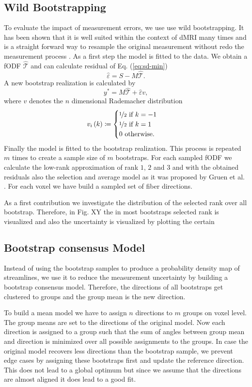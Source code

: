 \subsection{Wild Bootstrapping}
To evaluate the impact of measurement errors, we use use wild bootstrapping. It
has been shown that it is well suited within the context of dMRI many times and
is a straight forward way to
resample the original measurement without redo the measurement process
\cite{Jones:2008}.
As a first step the model is fitted to the data. We obtain a fODF
$\hat{\mathcal{T}}$ and can calculate residual of Eq. (\ref{eq:sd-min}) 
\[ \hat{\varepsilon} = S - M\hat{\mathcal{T}} .\] 
A new bootstrap realization is calculated by 
\[ y^{*} = M\hat{\mathcal{T}}  + \hat{\varepsilon} v , \]
where $v$ denotes the $n$ dimensional Rademacher distribution
 \[ v_i \left( k \right) \coloneqq  \begin{cases} \nicefrac{1}{2} \text{ if } k=-1 \\
	 \nicefrac{1}{2} \text{ if } k=1 \\
		0 \text { otherwise. } 
\end{cases} \]
 Finally the model is fitted to the bootstrap realization. This process is repeated $m$
times to create a sample size of $m$ bootstraps.
For each sampled fODF we calculate the low-rank approximation of rank $1$, $2$ and $3$
and with the obtained residuals also the selection and average model as it was
proposed by Gruen et al. \cite{Gruen:2021}. For each voxel we have build a
sampled set of fiber directions.  

As a first contribution we investigate the distribution of the selected rank
over all bootstrap. Therefore, in Fig. XY the in most bootstraps selected rank
is visualized and also the uncertainty is visualized by plotting the certain
\subsection{Bootstrap consensus Model}
Instead of using the bootstrap samples to produce a probability density map of
streamlines, we use it to reduce the measurement uncertainty by building a  bootstrap consensus model.
Therefore, the directions of all bootstraps get clustered to groups and the
group mean is the new direction.

To build a mean model we have to assign $n$ directions to $m$ groups on voxel
level. The group means are set to the directions of the original model. Now each
direction is assigned to a group such that the sum of angles between group mean
and direction is minimized over all possible assignments to the groups. In case
the original model recovers less directions than the bootstrap sample, we
prevent edge cases by assigning these bootstraps first and update the reference
direction. This does not lead to a global optimum but since we assume that the
directions are almost aligned it does lead to a good fit. 

